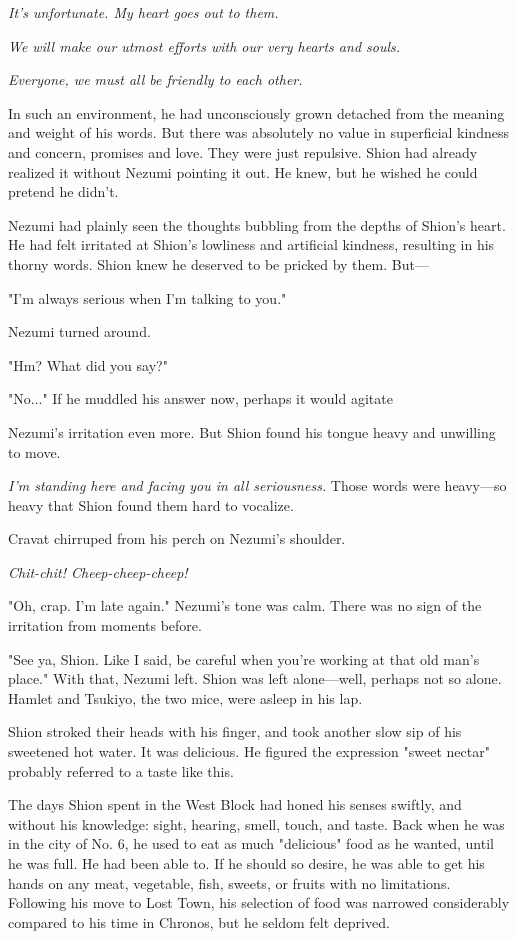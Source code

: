 \emph{It's unfortunate. My heart goes out to them.}

\emph{We will make our utmost efforts with our very hearts and souls.}

\emph{Everyone, we must all be friendly to each other.}

In such an environment, he had unconsciously grown detached from the
meaning and weight of his words. But there was absolutely no value in
superficial kindness and concern, promises and love. They were just
repulsive. Shion had already realized it without Nezumi pointing it out.
He knew, but he wished he could pretend he didn't.

Nezumi had plainly seen the thoughts bubbling from the depths of Shion's
heart. He had felt irritated at Shion's lowliness and artificial
kindness, resulting in his thorny words. Shion knew he deserved to be
pricked by them. But---

"I'm always serious when I'm talking to you."

Nezumi turned around.

"Hm? What did you say?"

"No..." If he muddled his answer now, perhaps it would agitate~

Nezumi's irritation even more. But Shion found his tongue heavy and
unwilling to move.

\emph{I'm standing here and facing you in all seriousness.} Those words were
heavy---so heavy that Shion found them hard to vocalize.

Cravat chirruped from his perch on Nezumi's shoulder.

\emph{Chit-chit! Cheep-cheep-cheep!}

"Oh, crap. I'm late again." Nezumi's tone was calm. There was no sign of
the irritation from moments before.

"See ya, Shion. Like I said, be careful when you're working at that old
man's place." With that, Nezumi left. Shion was left alone---well, perhaps
not so alone. Hamlet and Tsukiyo, the two mice, were asleep in his lap.

Shion stroked their heads with his finger, and took another slow sip of
his sweetened hot water. It was delicious. He figured the expression
"sweet nectar" probably referred to a taste like this.

The days Shion spent in the West Block had honed his senses swiftly, and
without his knowledge: sight, hearing, smell, touch, and taste. Back
when he was in the city of No. 6, he used to eat as much "delicious"
food as he wanted, until he was full. He had been able to. If he should
so desire, he was able to get his hands on any meat, vegetable, fish,
sweets, or fruits with no limitations. Following his move to Lost Town,
his selection of food was narrowed considerably compared to his time in
Chronos, but he seldom felt deprived.

